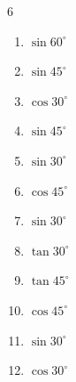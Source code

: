 \begin{multicols}{6}
\begin{enumerate}
  \item $\displaystyle \sin{60^\circ}$


  \item $\displaystyle \sin{45^\circ}$


  \item $\displaystyle \cos{30^\circ}$


  \item $\displaystyle \sin{45^\circ}$


\columnbreak %

  \item $\displaystyle \sin{30^\circ}$


  \item $\displaystyle \cos{45^\circ}$


  \item $\displaystyle \sin{30^\circ}$


  \item $\displaystyle \tan{30^\circ}$


  \item $\displaystyle \tan{45^\circ}$

        \phantom{$\displaystyle =1$}

  \item $\displaystyle \cos{45^\circ}$


  \item $\displaystyle \sin{30^\circ}$


  \item $\displaystyle \cos{30^\circ}$



\end{enumerate}
\end{multicols}
